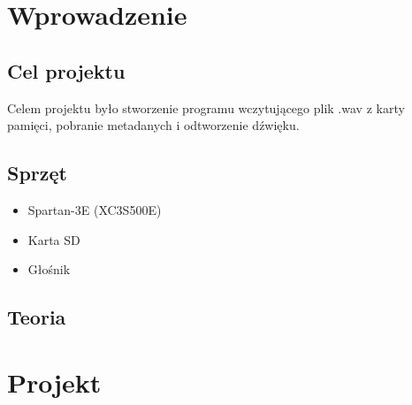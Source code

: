 \documentclass{article}
\begin{document}

\newpage
\section{Wprowadzenie}
\subsection{Cel projektu}
\par Celem projektu było stworzenie programu wczytującego plik .wav z karty pamięci, pobranie metadanych i odtworzenie dźwięku.
\subsection{Sprzęt}
\begin{itemize}
	\item{Spartan-3E (XC3S500E)}
	\item{Karta SD}
	\item{Głośnik}
\end{itemize}

\subsection{Teoria}
\par 
\newpage
\section{Projekt}
\end{document}
